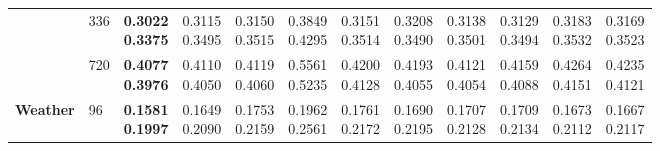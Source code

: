 \begin{longtable}{@{}llcccccccccc@{}}
 & 336 & \shortstack{\colorbox[gray]{0.82}{\textbf{0.3022}}\\\colorbox[gray]{0.82}{\textbf{0.3375}}} & \shortstack{\colorbox[gray]{0.92}{0.3115}\\0.3495} & \shortstack{0.3150\\0.3515} & \shortstack{0.3849\\0.4295} & \shortstack{0.3151\\0.3514} & \shortstack{0.3208\\\colorbox[gray]{0.92}{0.3490}} & \shortstack{0.3138\\0.3501} & \shortstack{0.3129\\0.3494} & \shortstack{0.3183\\0.3532} & \shortstack{0.3169\\0.3523} \\ \cline{2-12}

 & 720 & \shortstack{\colorbox[gray]{0.82}{\textbf{0.4077}}\\\colorbox[gray]{0.82}{\textbf{0.3976}}} & \shortstack{\colorbox[gray]{0.92}{0.4110}\\\colorbox[gray]{0.92}{0.4050}} & \shortstack{0.4119\\0.4060} & \shortstack{0.5561\\0.5235} & \shortstack{0.4200\\0.4128} & \shortstack{0.4193\\0.4055} & \shortstack{0.4121\\0.4054} & \shortstack{0.4159\\0.4088} & \shortstack{0.4264\\0.4151} & \shortstack{0.4235\\0.4121} \\ \hline

\textbf{Weather} & 96 & \shortstack{\colorbox[gray]{0.82}{\textbf{0.1581}}\\\colorbox[gray]{0.82}{\textbf{0.1997}}} & \shortstack{\colorbox[gray]{0.92}{0.1649}\\\colorbox[gray]{0.92}{0.2090}} & \shortstack{0.1753\\0.2159} & \shortstack{0.1962\\0.2561} & \shortstack{0.1761\\0.2172} & \shortstack{0.1690\\0.2195} & \shortstack{0.1707\\0.2128} & \shortstack{0.1709\\0.2134} & \shortstack{0.1673\\0.2112} & \shortstack{0.1667\\0.2117} \\ \cline{2-12}


\end{longtable}
